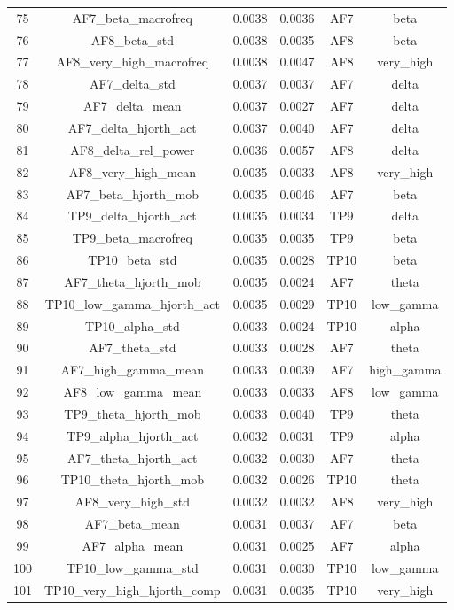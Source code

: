 \begin{table}[hptb]
\begin{table}
\begin{tabular}{cccccc}
75 & AF7_beta_macrofreq & 0.0038 & 0.0036 & AF7 & beta \\
76 & AF8_beta_std & 0.0038 & 0.0035 & AF8 & beta \\
77 & AF8_very_high_macrofreq & 0.0038 & 0.0047 & AF8 & very_high \\
78 & AF7_delta_std & 0.0037 & 0.0037 & AF7 & delta \\
79 & AF7_delta_mean & 0.0037 & 0.0027 & AF7 & delta \\
80 & AF7_delta_hjorth_act & 0.0037 & 0.0040 & AF7 & delta \\
81 & AF8_delta_rel_power & 0.0036 & 0.0057 & AF8 & delta \\
82 & AF8_very_high_mean & 0.0035 & 0.0033 & AF8 & very_high \\
83 & AF7_beta_hjorth_mob & 0.0035 & 0.0046 & AF7 & beta \\
84 & TP9_delta_hjorth_act & 0.0035 & 0.0034 & TP9 & delta \\
85 & TP9_beta_macrofreq & 0.0035 & 0.0035 & TP9 & beta \\
86 & TP10_beta_std & 0.0035 & 0.0028 & TP10 & beta \\
87 & AF7_theta_hjorth_mob & 0.0035 & 0.0024 & AF7 & theta \\
88 & TP10_low_gamma_hjorth_act & 0.0035 & 0.0029 & TP10 & low_gamma \\
89 & TP10_alpha_std & 0.0033 & 0.0024 & TP10 & alpha \\
90 & AF7_theta_std & 0.0033 & 0.0028 & AF7 & theta \\
91 & AF7_high_gamma_mean & 0.0033 & 0.0039 & AF7 & high_gamma \\
92 & AF8_low_gamma_mean & 0.0033 & 0.0033 & AF8 & low_gamma \\
93 & TP9_theta_hjorth_mob & 0.0033 & 0.0040 & TP9 & theta \\
94 & TP9_alpha_hjorth_act & 0.0032 & 0.0031 & TP9 & alpha \\
95 & AF7_theta_hjorth_act & 0.0032 & 0.0030 & AF7 & theta \\
96 & TP10_theta_hjorth_mob & 0.0032 & 0.0026 & TP10 & theta \\
97 & AF8_very_high_std & 0.0032 & 0.0032 & AF8 & very_high \\
98 & AF7_beta_mean & 0.0031 & 0.0037 & AF7 & beta \\
99 & AF7_alpha_mean & 0.0031 & 0.0025 & AF7 & alpha \\
100 & TP10_low_gamma_std & 0.0031 & 0.0030 & TP10 & low_gamma \\
101 & TP10_very_high_hjorth_comp & 0.0031 & 0.0035 & TP10 & very_high \\

\end{tabular}
\end{table}
\end{table}
